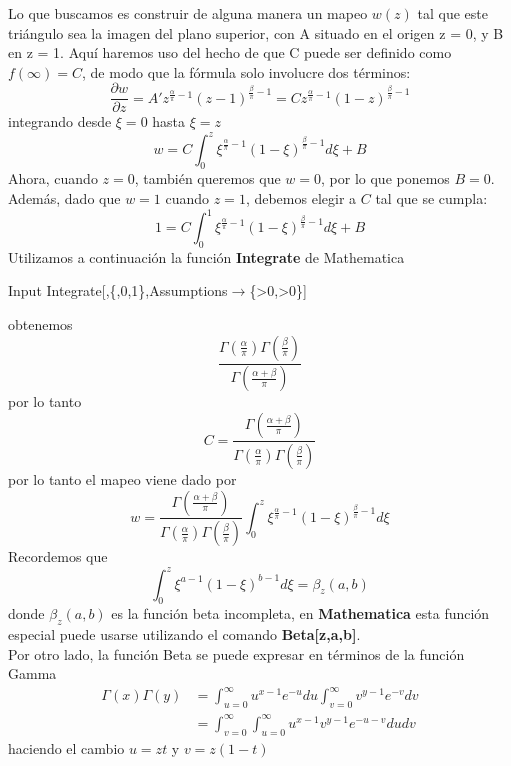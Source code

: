 Lo que buscamos es construir de alguna manera un mapeo $w(z)$ tal que este triángulo sea la imagen del plano superior, con A situado en el origen z = 0, y B en z = 1. Aquí haremos uso del hecho de que C puede ser definido como $f(\infty)=C$, de modo que la fórmula \SC solo involucre dos términos:
$$\dfrac{\partial w}{\partial z}=A' z^{\frac{\alpha}{\pi}-1}(z-1)^{\frac{\beta}{\pi}-1}=Cz^{\frac{\alpha}{\pi}-1}(1-z)^{\frac{\beta}{\pi}-1}$$
integrando desde $\xi=0$ hasta $\xi=z$
$$w=C\int_{0}^{z}\xi^{\frac{\alpha}{\pi}-1}(1-\xi)^{\frac{\beta}{\pi}-1}d\xi+B$$
Ahora, cuando $z = 0$, también queremos que $w = 0$, por lo que ponemos $B = 0$. Además, dado que $w = 1$ cuando $z = 1$, debemos elegir a $C$ tal que se cumpla:
$$1=C\int_{0}^{1}\xi^{\frac{\alpha}{\pi}-1}(1-\xi)^{\frac{\beta}{\pi}-1}d\xi+B$$
Utilizamos a continuación la función \textbf{Integrate} de Mathematica
\begin{mmaCell}{Input}
	 Integrate[,\{\mmaFnc{\(\pmb{\xi}\)},0,1\},Assumptions\(\pmb{\to}\)\{\mmaUnd{\(\pmb{\alpha}\)}>0,\mmaUnd{\(\pmb{\beta}\)}>0\}]
\end{mmaCell}
obtenemos
$$\dfrac{\Gamma\left(\frac{\alpha}{\pi}\right)\Gamma\left(\frac{\beta}{\pi}\right)}{\Gamma\left(\frac{\alpha+\beta}{\pi}\right)}$$
por lo tanto 
$$C=\dfrac{\Gamma\left(\frac{\alpha+\beta}{\pi}\right)}{\Gamma\left(\frac{\alpha}{\pi}\right)\Gamma\left(\frac{\beta}{\pi}\right)}$$
por lo tanto el mapeo viene dado por 
\begin{equation}
	w=\dfrac{\Gamma\left(\frac{\alpha+\beta}{\pi}\right)}{\Gamma\left(\frac{\alpha}{\pi}\right)\Gamma\left(\frac{\beta}{\pi}\right)}\int_{0}^{z}\xi^{\frac{\alpha}{\pi}-1}(1-\xi)^{\frac{\beta}{\pi}-1}d\xi
\end{equation}
Recordemos que  $$\int_{0}^{z}\xi^{a-1}(1-\xi)^{b-1}d\xi = \beta_z(a,b)$$
donde $\beta_z(a,b)$ es la función beta incompleta, en \textbf{Mathematica} esta función especial puede usarse utilizando el comando \textbf{Beta[z,a,b]}.\\
Por otro lado, la función Beta se puede expresar en términos de la función Gamma
\[
	{\displaystyle {\begin{aligned}\Gamma (x)\Gamma (y)&=\int _{u=0}^{\infty }u^{x-1}e^{-u}du\int _{v=0}^{\infty }v^{y-1}e^{-v}dv\\&=\int _{v=0}^{\infty }\int _{u=0}^{\infty }u^{x-1}v^{y-1}e^{-u-v}dudv\end{aligned}}}
\]
haciendo el cambio $u=zt$ y $v=z(1-t)$


